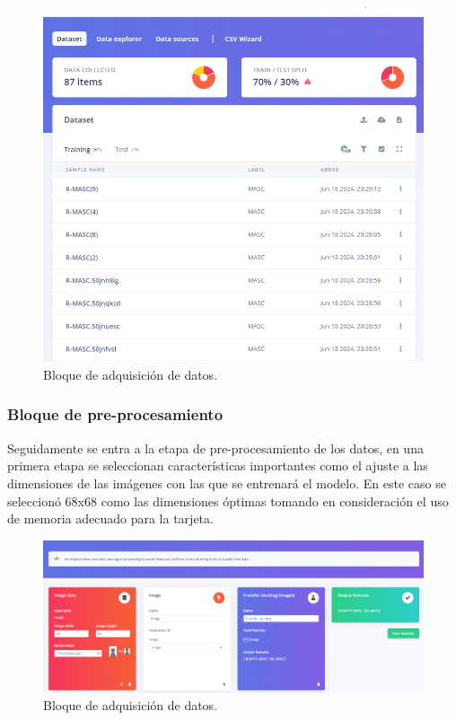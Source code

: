 \begin{figure}[H]
\centering
\includegraphics[width=130mm]{./Figuras/Desarrollo_Analisis/ADQUISION_DE_DATOS}
\caption{Bloque de adquisición de datos.} 
\label{fig:data1}
\end{figure}

\subsubsection{Bloque de pre-procesamiento} 
Seguidamente se entra a la etapa de pre-procesamiento de los datos, en una primera etapa se seleccionan características importantes como el ajuste a las dimensiones de las imágenes con las que se entrenará el modelo. En este caso se seleccionó 68x68 como las dimensiones óptimas tomando en consideración el uso de memoria adecuado para la tarjeta.
\begin{figure}[H]
\centering
\includegraphics[width=150mm]{./Figuras/Desarrollo_Analisis/prepro1}
\caption{Bloque de adquisición de datos.} 
\label{fig:prepro1}
\end{figure}

